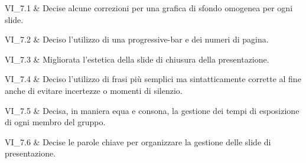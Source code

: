 VI\_7.1 & Decise alcune correzioni per una grafica di sfondo omogenea per ogni slide.

\tabularnewline 
VI\_7.2 & Deciso l'utilizzo di una progressive-bar e dei numeri di pagina.

\tabularnewline 
VI\_7.3 & Migliorata l'estetica della slide di chiusura della presentazione.

\tabularnewline 
VI\_7.4 & Deciso l'utilizzo di frasi più semplici ma sintatticamente corrette al fine anche di evitare incertezze o momenti di silenzio.

\tabularnewline 
VI\_7.5 & Decisa, in maniera equa e consona, la gestione dei tempi di esposizione di ogni membro del gruppo.
		
\tabularnewline 
VI\_7.6 & Decise le parole chiave per organizzare la gestione delle slide di presentazione.
